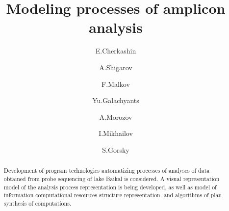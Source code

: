 \documentclass[12pt]{llncs}  %
\begin{document}

\begin{englishtitle} %
\title{Modeling  processes of amplicon analysis}
\author{E.Cherkashin  %
  \and  %
  A.Shigarov \and
  F.Malkov \and
  Yu.Galachyants \and
  A.Morozov \and
  I.Mikhailov \and
  S.Gorsky
} %


\maketitle
\begin{abstract}
Development of program technologies automatizing processes of analyses of data obtained from probe sequencing of lake Baikal is considered.  A visual representation model of the analysis process representation is being developed, as well as model of information-computational resources structure representation, and algorithms of plan synthesis of computations.

\end{abstract}
\end{englishtitle}
\end{document}
